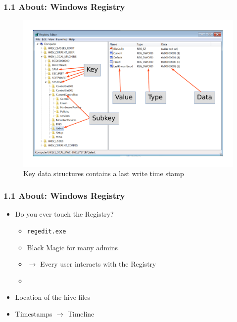 \begin{frame}[fragile]
  \frametitle{1.1 About: Windows Registry}
    \begin{figure}
        \includegraphics[scale=0.43]{images/nomenclature.pdf}
        \captionsetup{labelformat=empty,labelsep=none}
        \caption[]{\tiny Key data structures contains a last write time stamp}
    \end{figure}
\end{frame}


\begin{frame}[fragile]
  \frametitle{1.1 About: Windows Registry}
    \begin{itemize}
        \item Do you ever touch the Registry?
            \begin{itemize}
		\item \texttt{regedit.exe}
                \item Black Magic for many admins
		\item[] $\to$ Every user interacts with the Registry
		\item[]
            \end{itemize}
        \item Location of the hive files
        \item Timestamps $\to$ Timeline
    \end{itemize}
\end{frame}


